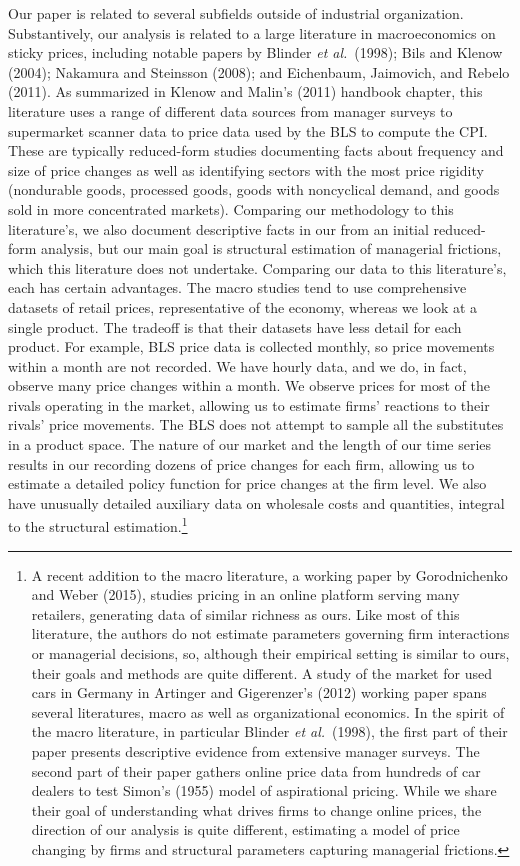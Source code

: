 \documentclass[11pt]{article}
\begin{document}
\begin{spacing}{1.3}
Our paper is related to several subfields outside of industrial
organization. Substantively, our analysis is related to a large
literature in macroeconomics on sticky prices, including notable
papers by Blinder {\em et al.}\ (1998); Bils and Klenow (2004);
Nakamura and Steinsson (2008); and Eichenbaum, Jaimovich, and Rebelo
(2011). As summarized in Klenow and Malin's (2011) handbook chapter,
this literature uses a range of different data sources from manager
surveys to supermarket scanner data to price data used by the BLS to
compute the CPI. These are typically reduced-form studies documenting
facts about frequency and size of price changes as well as identifying
sectors with the most price rigidity (nondurable goods, processed
goods, goods with noncyclical demand, and goods sold in more
concentrated markets).  Comparing our methodology to this
literature's, we also document descriptive facts in our from an
initial reduced-form analysis, but our main goal is structural
estimation of managerial frictions, which this literature does not
undertake.  Comparing our data to this literature's, each has certain
advantages.  The macro studies tend to use comprehensive datasets of
retail prices, representative of the economy, whereas we look at a
single product. The tradeoff is that their datasets have less detail
for each product. For example, BLS price data is collected monthly, so
price movements within a month are not recorded. We have hourly data,
and we do, in fact, observe many price changes within a month. We
observe prices for most of the rivals operating in the market,
allowing us to estimate firms' reactions to their rivals' price
movements.  The BLS does not attempt to sample all the substitutes in
a product space. The nature of our market and the length of our time
series results in our recording dozens of price changes for each firm,
allowing us to estimate a detailed policy function for price changes
at the firm level. We also have unusually detailed auxiliary data on
wholesale costs and quantities, integral to the structural
estimation.\footnote{A recent addition to the macro literature, a
  working paper by Gorodnichenko and Weber (2015), studies pricing in
  an online platform serving many retailers, generating data of
  similar richness as ours. Like most of this literature, the authors
  do not estimate parameters governing firm interactions or managerial
  decisions, so, although their empirical setting is similar to ours,
  their goals and methods are quite different. A study of the market
  for used cars in Germany in Artinger and Gigerenzer's (2012) working
  paper spans several literatures, macro as well as organizational
  economics. In the spirit of the macro literature, in particular
  Blinder {\em et al.}\ (1998), the first part of their paper presents
  descriptive evidence from extensive manager surveys. The second part
  of their paper gathers online price data from hundreds of car
  dealers to test Simon's (1955) model of aspirational pricing. While
  we share their goal of understanding what drives firms to change
  online prices, the direction of our analysis is quite different,
  estimating a model of price changing by firms and structural
  parameters capturing managerial frictions.}


\end{spacing}
\end{document}
